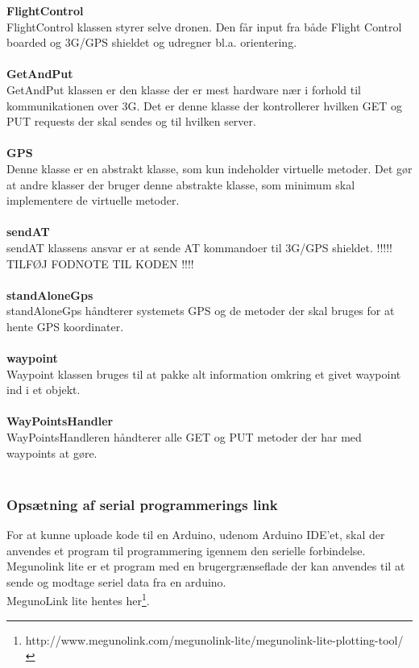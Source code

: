 \textbf{FlightControl}\\
FlightControl klassen styrer selve dronen. Den får input fra både Flight Control boarded og 3G/GPS shieldet og udregner bl.a. orientering. \\ \\

\textbf{GetAndPut}\\
GetAndPut klassen er den klasse der er mest hardware nær i forhold til kommunikationen over 3G. Det er denne klasse der kontrollerer hvilken GET og PUT requests der skal sendes og til hvilken server. \\ \\ 

\textbf{GPS}\\
Denne klasse er en abstrakt klasse, som kun indeholder virtuelle metoder. Det gør at andre klasser der bruger denne abstrakte klasse, som minimum skal implementere de virtuelle metoder. \\ \\

\textbf{sendAT}\\
sendAT klassens ansvar er at sende AT kommandoer til 3G/GPS shieldet. !!!!! TILFØJ FODNOTE TIL KODEN !!!!\\ \\ 

\textbf{standAloneGps}\\
standAloneGps håndterer systemets GPS og de metoder der skal bruges for at hente GPS koordinater. \\ \\

\textbf{waypoint}\\
Waypoint klassen bruges til at pakke alt information omkring et givet waypoint ind i et objekt.\\ \\

\textbf{WayPointsHandler}\\
WayPointsHandleren håndterer alle GET og PUT metoder der har med waypoints at gøre. \\ \\

\newpage

\subsubsection*{Opsætning af serial programmerings link}

For at kunne uploade kode til en Arduino, udenom Arduino IDE'et, skal der anvendes et program til programmering igennem den serielle forbindelse.
Megunolink lite er et program med en brugergrænseflade der kan anvendes til at sende og modtage seriel data fra en arduino.\\
MegunoLink lite hentes her\footnote{http://www.megunolink.com/megunolink-lite/megunolink-lite-plotting-tool/}.


